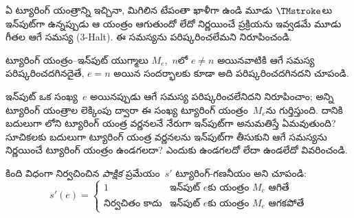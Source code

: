 \documentclass[../../../include/open-logic-section]{subfiles}
\begin{document}
\begin{prob}
ఏ ట్యూరింగ్ యంత్రాన్ని ఇచ్చినా, మిగిలిన టేపంతా ఖాళీగా ఉండి మూడు
$\TMstroke$లు ఇన్‌పుట్‌గా ఉన్నప్పుడు ఆ యంత్రం ఆగుతుందో లేదో నిర్ణయించే
ప్రక్రియను ఇవ్వడమే మూడు గీతల ఆగే సమస్య (3-Halt). ఈ సమస్యను పరిష్కరించలేమని
నిరూపించండి.
\end{prob}

\begin{prob}
ట్యూరింగ్ యంత్రం--ఇన్‌పుట్ యుగ్మాలు $M_e$,~$n$లో $e \neq n$ అయినవాటికి ఆగే
సమస్య పరిష్కరించదగినదైతే, $e = n$ అయిన సందర్భాలకు కూడా అది పరిష్కరించదగినదని
చూపండి.
\end{prob}

\begin{prob}
ఇన్‌పుట్ ఒక సంఖ్య~$e$ అయినప్పుడు ఆగే సమస్య పరిష్కరించలేనిదని నిరూపించాం;
అన్ని ట్యూరింగ్ యంత్రాల లెక్కింపు ద్వారా ఈ సంఖ్య ట్యూరింగ్ యంత్రం~$M_e$ను
గుర్తిస్తుంది. దానికి బదులుగా లోని ట్యూరింగ్ యంత్ర
వర్ణనలనే నేరుగా ఇన్‌పుట్‌గా అనుమతిస్తే ఏమవుతుంది? సూచికలకు బదులుగా ట్యూరింగ్
యంత్ర వర్ణనలను ఇన్‌పుట్‌గా తీసుకుని ఆగే సమస్యను నిర్ణయించే ట్యూరింగ్ యంత్రం
ఉండగలదా? ఎందుకు ఉండగలదో లేదా ఉండలేదో వివరించండి.
\end{prob}

\begin{prob} కింది విధంగా నిర్వచించిన \emph{పాక్షిక} ప్రమేయం~$s'$ ట్యూరింగ్-గణనీయం
అని చూపండి:
  \[
  s'(e) =
  \begin{cases}
    \text{1} & \text{ఇన్‌పుట్ $e$కు యంత్రం~$M_e$ ఆగితే}\\
    \text{నిర్వచితం కాదు} & \text{ఇన్‌పుట్ $e$కు యంత్రం~$M_e$ ఆగకపోతే}
  \end{cases}
  \]
\end{prob}
\end{document}
